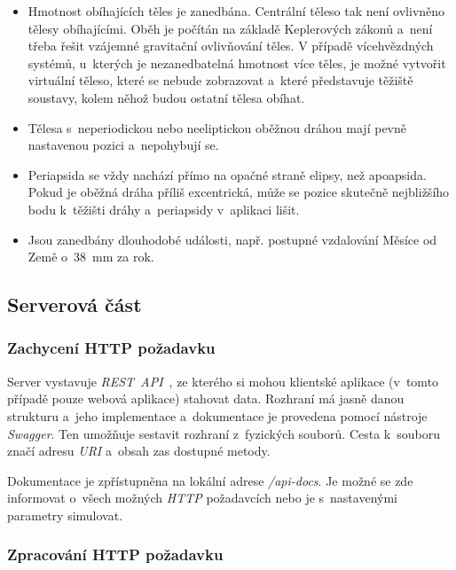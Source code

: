 \documentclass[a4paper,12pt]{article}
\begin{document}
\begin{itemize}
\item Hmotnost obíhajících těles je zanedbána. Centrální těleso tak není ovlivněno tělesy obíhajícími. Oběh je počítán na základě Keplerových zákonů a~není třeba řešit vzájemné gravitační ovlivňování těles. V případě vícehvězdných systémů, u~kterých je nezanedbatelná hmotnost více těles, je možné vytvořit virtuální těleso, které se nebude zobrazovat a~které představuje těžiště soustavy, kolem něhož budou ostatní tělesa obíhat.

\item Tělesa s~neperiodickou nebo neeliptickou oběžnou dráhou mají pevně nastavenou pozici a~nepohybují se.

\item Periapsida se vždy nachází přímo na opačné straně elipsy, než apoapsida. Pokud je oběžná dráha příliš excentrická, může se pozice skutečně nejbližšího bodu k~těžišti dráhy a~periapsidy v~aplikaci lišit.

\item Jsou zanedbány dlouhodobé události, např. postupné vzdalování Měsíce od Země o~38~mm za rok.~\cite{rees}
\end{itemize}

\subsection{Serverová část}

\subsubsection{Zachycení HTTP požadavku}

Server vystavuje \textit{REST~API}~\cite{nodebook}, ze kterého si mohou klientské aplikace (v~tomto případě pouze webová aplikace) stahovat data. Rozhraní má jasně danou strukturu a~jeho implementace a~dokumentace je provedena pomocí nástroje \textit{Swagger}. Ten umožňuje sestavit rozhraní z~fyzických souborů. Cesta k~souboru značí adresu \textit{URI} a~obsah zas dostupné metody.



Dokumentace je zpřístupněna na lokální adrese \textit{/api-docs}. Je možné se zde informovat o~všech možných \textit{HTTP} požadavcích nebo je s~nastavenými parametry simulovat.

\subsubsection{Zpracování HTTP požadavku}
\end{document}
